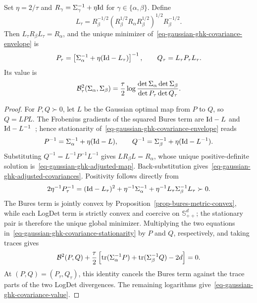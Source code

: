 \begin{prop}\label{prop-gaussian-ghk-adjusted-covariances}
Set $\eta=2/\tau$ and $R_\gamma=\Sigma_\gamma^{-1}+\eta\mathrm{Id}$ for $\gamma\in\{\alpha,\beta\}$. Define
\begin{equation}\label{eq-gaussian-ghk-adjusted-map}
L_\tau
=
R_\beta^{-1/2}
\left(R_\beta^{1/2}R_\alpha R_\beta^{1/2}\right)^{1/2}
R_\beta^{-1/2}.
\end{equation}
Then $L_\tau R_\beta L_\tau=R_\alpha$, and the unique minimizer of~\eqref{eq-gaussian-ghk-covariance-envelope} is
\begin{equation}\label{eq-gaussian-ghk-adjusted-covariances}
P_\tau=\left[\Sigma_\alpha^{-1}+\eta(\mathrm{Id}-L_\tau)\right]^{-1},
\qquad
Q_\tau=L_\tau P_\tau L_\tau.
\end{equation}
Its value is
\begin{equation}\label{eq-gaussian-ghk-covariance-value}
\mathcal{B}_\tau^2(\Sigma_\alpha,\Sigma_\beta)
=
\frac{\tau}{2}
\log\frac{\det\Sigma_\alpha\det\Sigma_\beta}
{\det P_\tau\det Q_\tau}.
\end{equation}
\end{prop}

\begin{proof}
For $P,Q\succ0$, let $L$ be the Gaussian optimal map from $P$ to $Q$, so $Q=LPL$. The Frobenius gradients of the squared Bures term are $\mathrm{Id}-L$ and $\mathrm{Id}-L^{-1}$~\cite{bhatia2018bures}; hence stationarity of~\eqref{eq-gaussian-ghk-covariance-envelope} reads
\begin{equation}\label{eq-gaussian-ghk-covariance-stationarity}
P^{-1}=\Sigma_\alpha^{-1}+\eta(\mathrm{Id}-L),
\qquad
Q^{-1}=\Sigma_\beta^{-1}+\eta(\mathrm{Id}-L^{-1}).
\end{equation}
Substituting $Q^{-1}=L^{-1}P^{-1}L^{-1}$ gives $LR_\beta L=R_\alpha$, whose unique positive-definite solution is~\eqref{eq-gaussian-ghk-adjusted-map}. Back-substitution gives~\eqref{eq-gaussian-ghk-adjusted-covariances}. Positivity follows directly from
\[
2\eta^{-1}P_\tau^{-1}
=(\mathrm{Id}-L_\tau)^2
+\eta^{-1}\Sigma_\alpha^{-1}
+\eta^{-1}L_\tau\Sigma_\beta^{-1}L_\tau
\succ0.
\]
The Bures term is jointly convex by Proposition~\ref{prop-bures-metric-convex}, while each LogDet term is strictly convex and coercive on $\mathbb S_{++}^d$; the stationary pair is therefore the unique global minimizer. Multiplying the two equations in~\eqref{eq-gaussian-ghk-covariance-stationarity} by $P$ and $Q$, respectively, and taking traces gives
\[
\mathcal{B}^2(P,Q)
+\frac{\tau}{2}
\left[
\operatorname{tr}(\Sigma_\alpha^{-1}P)+\operatorname{tr}(\Sigma_\beta^{-1}Q)-2d
\right]
=0.
\]
At $(P,Q)=(P_\tau,Q_\tau)$, this identity cancels the Bures term against the trace parts of the two LogDet divergences. The remaining logarithms give~\eqref{eq-gaussian-ghk-covariance-value}.
\end{proof}

